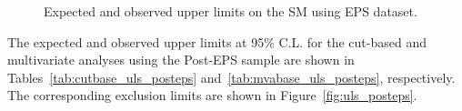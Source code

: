 \begin{figure}[!hbtp]
\centering
{}

\caption{Expected and observed upper limits on the SM using EPS dataset.}
\label{fig:uls_eps}
\end{figure}

The expected and observed upper limits at 95\% C.L. for the cut-based and
multivariate analyses using the Post-EPS sample are shown in 
Tables~\ref{tab:cutbase_uls_posteps} and~\ref{tab:mvabase_uls_posteps}, respectively. 
The corresponding exclusion limits are shown in Figure~\ref{fig:uls_posteps}.

